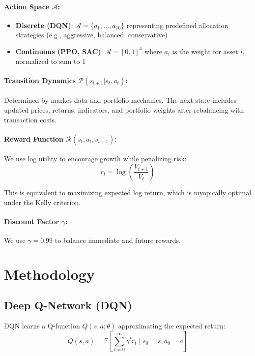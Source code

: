 \documentclass[12pt]{article}
\begin{document}
\paragraph{Action Space $\mathcal{A}$:}
\begin{itemize}
    \item \textbf{Discrete (DQN)}: $\mathcal{A} = \{a_1, \ldots, a_{10}\}$ representing predefined allocation strategies (e.g., aggressive, balanced, conservative)
    \item \textbf{Continuous (PPO, SAC)}: $\mathcal{A} = [0, 1]^4$ where $a_i$ is the weight for asset $i$, normalized to sum to 1
\end{itemize}

\paragraph{Transition Dynamics $\mathcal{P}(s_{t+1} | s_t, a_t)$:}
Determined by market data and portfolio mechanics. The next state includes updated prices, returns, indicators, and portfolio weights after rebalancing with transaction costs.

\paragraph{Reward Function $\mathcal{R}(s_t, a_t, s_{t+1})$:}
We use log utility to encourage growth while penalizing risk:
\begin{equation}
    r_t = \log\left( \frac{V_{t+1}}{V_t} \right)
\end{equation}

This is equivalent to maximizing expected log return, which is myopically optimal under the Kelly criterion.

\paragraph{Discount Factor $\gamma$:}
We use $\gamma = 0.99$ to balance immediate and future rewards.

\section{Methodology}

\subsection{Deep Q-Network (DQN)}

DQN \citep{mnih2015} learns a Q-function $Q(s, a; \theta)$ approximating the expected return:
\begin{equation}
    Q(s, a) = \mathbb{E}\left[ \sum_{t=0}^\infty \gamma^t r_t \mid s_0 = s, a_0 = a \right]
\end{equation}
\end{document}

